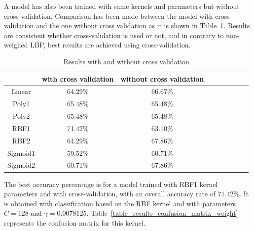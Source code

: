 \noindent A model has also been trained with same kernels and parameters but without cross-validation. Comparison has been made between the model with cross validation and the one without cross validation as it is shown in  Table~\ref{table_results_crossvalidation_weight}. Results are consistent whether cross-validation is used or not, and in contrary to non-weighed LBP, best results are achieved using cross-validation.
\newline

\begin{table}[h]
\begin{center}
   \caption{\label{table_results_crossvalidation_weight} Results with and without cross validation}
\begin{tabular}{|c|c|c|c|c|c|c|c|c|}
  \hline
    & with cross validation & without cross validation \\
  \hline
  Linear & 64.29\% & 66.67\% \\
  Poly1 & 65.48\% & 65.48\% \\
  Poly2 & 65.48\% & 65.48\% \\
  RBF1 & 71.42\% & 63.10\% \\
  RBF2 & 64.29\% & 67.86\% \\
  Sigmoid1 & 59.52\% & 60.71\% \\
  Sigmoid2 & 60.71\% & 67.86\% \\
  \hline
\end{tabular}
\end{center}
\end{table}

\noindent The best accuracy percentage is for a model trained with RBF1 kernel parameters and with cross-validation, with an overall accuracy rate of $ 71.42\% $. It is obtained with classification based on the RBF kernel and with parameters $ C = 128 $ and $ \gamma = 0.0078125 $. Table~\ref{table_results_confusion_matrix_weight} represents the confusion matrix for this kernel.
\newline

